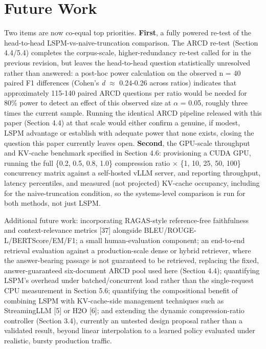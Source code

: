 \documentclass[pdflatex,sn-basic,Numbered]{sn-jnl}
\begin{document}
\section{Future Work}
Two items are now co-equal top priorities. \textbf{First}, a fully powered re-test of the head-to-head LSPM-vs-naive-truncation comparison. The ARCD re-test (Section 4.4/5.4) completes the corpus-scale, higher-redundancy re-test called for in the previous revision, but leaves the head-to-head question statistically unresolved rather than answered: a post-hoc power calculation on the observed n = 40 paired F1 differences (Cohen's \textit{d} $\approx$ 0.24-0.26 across ratios) indicates that approximately 115-140 paired ARCD questions per ratio would be needed for 80\% power to detect an effect of this observed size at $\alpha$ = 0.05, roughly three times the current sample. Running the identical ARCD pipeline released with this paper (Section 4.4) at that scale would either confirm a genuine, if modest, LSPM advantage or establish with adequate power that none exists, closing the question this paper currently leaves open. \textbf{Second}, the GPU-scale throughput and KV-cache benchmark specified in Section 4.6: provisioning a CUDA GPU, running the full \{0.2, 0.5, 0.8, 1.0\} compression ratio $\times$ \{1, 10, 25, 50, 100\} concurrency matrix against a self-hosted vLLM server, and reporting throughput, latency percentiles, and measured (not projected) KV-cache occupancy, including for the naive-truncation condition, so the systems-level comparison is run for both methods, not just LSPM.

Additional future work: incorporating RAGAS-style reference-free faithfulness and context-relevance metrics [37] alongside BLEU/ROUGE-L/BERTScore/EM/F1; a small human-evaluation component; an end-to-end retrieval evaluation against a production-scale dense or hybrid retriever, where the answer-bearing passage is not guaranteed to be retrieved, replacing the fixed, answer-guaranteed six-document ARCD pool used here (Section 4.4); quantifying LSPM's overhead under batched/concurrent load rather than the single-request CPU measurement in Section 5.6; quantifying the compositional benefit of combining LSPM with KV-cache-side management techniques such as StreamingLLM [5] or H2O [6]; and extending the dynamic compression-ratio controller (Section 3.4), currently an untested design proposal rather than a validated result, beyond linear interpolation to a learned policy evaluated under realistic, bursty production traffic.
\end{document}
